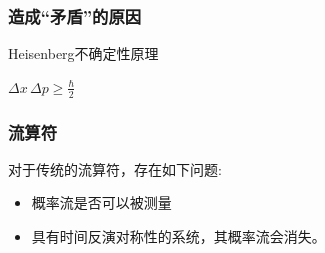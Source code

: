 \documentclass[UTF8]{beamer}
\begin{document}
\begin{frame}\frametitle{造成“矛盾”的原因}
	\begin{block}{Heisenberg不确定性原理}
		\Large
		\begin{center}
			$\Delta x \, \Delta p \geqslant \frac{\hbar}{2}$
		\end{center}
	\end{block}
\end{frame}
%
\begin{frame}\frametitle{流算符}
	对于传统的流算符，存在如下问题:
	\begin{itemize}
		\item 概率流是否可以被测量
		\item 具有时间反演对称性的系统，其概率流会消失。
	\end{itemize}
\end{frame}
\end{document}
